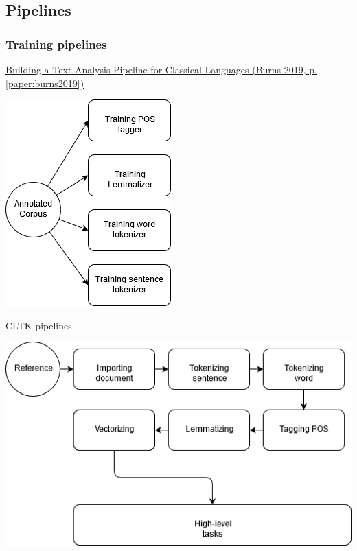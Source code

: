 \documentclass{beamer}
\begin{document}
\begin{frame}
\end{frame}
\subsection{Pipelines}

\begin{frame}
\frametitle{Training pipelines}


\href{https://www.degruyter.com/view/books/9783110599572/9783110599572-010/9783110599572-010.xml}{Building a Text Analysis Pipeline for Classical Languages (Burns 2019, p. \ref{paper:burns2019})} 

\begin{center}
    \includegraphics[scale=0.5]{cltk_pipelines-cltk_pipelines_training.png}    
\end{center}

\end{frame}

\begin{frame}{CLTK pipelines}
\begin{center}
    \includegraphics[scale=0.5]{cltk_pipelines-cltk_pipelines_executing.png}
    \end{center}
\end{frame}
\end{document}
